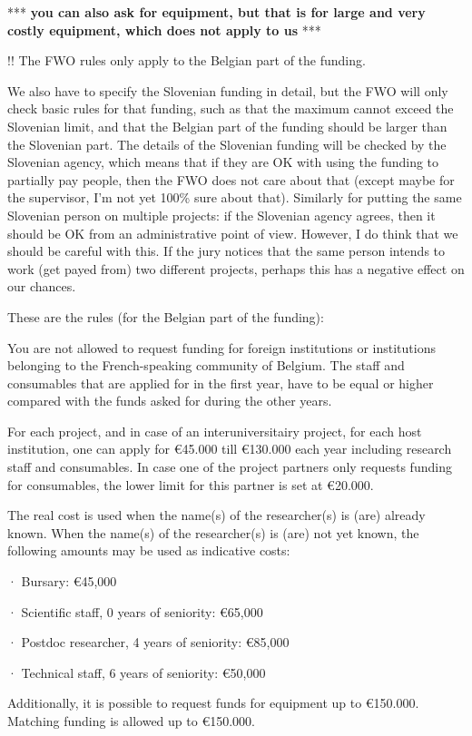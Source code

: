 \documentclass[11pt,dvipsnames,usenames,a4paper]{article}
\begin{document}
*** {\bf\color{blue} you can also ask for equipment, but that is for large and very costly equipment, which does not apply to us} ***

!! The FWO rules only apply to the Belgian part of the funding.

We also have to specify the Slovenian funding in detail, but the FWO will only check basic rules for that funding, such as that the maximum cannot exceed the Slovenian limit, and that the Belgian part of the funding should be larger than the Slovenian part. The details of the Slovenian funding will be checked by the Slovenian agency, which means that if they are OK with using the funding to partially pay people, then the FWO does not care about that (except maybe for the supervisor, I'm not yet 100\% sure about that). Similarly for putting the same Slovenian person on multiple projects: if the Slovenian agency agrees, then it should be OK from an administrative point of view. However, I do think that we should be careful with this. If the jury notices that the same person intends to work (get payed from) two different projects, perhaps this has a negative effect on our chances.

{\color{Gray}These are the rules (for the Belgian part of the funding):

You are not allowed to request funding for foreign institutions or institutions belonging to the French-speaking community of Belgium. The staff and consumables that are applied for in the first year, have to be equal or higher compared with the funds asked for during the other years. 

For each project, and in case of an interuniversitairy project, for each host institution, one can apply for €45.000 till €130.000 each year including research staff and consumables. In case one of the project partners only requests funding for consumables, the lower limit for this partner is set at €20.000. 

The real cost is used when the name(s) of the researcher(s) is (are) already known. When the name(s) of the researcher(s) is (are) not yet known, the following amounts may be used as indicative costs:

·         Bursary: €45,000

·         Scientific staff, 0 years of seniority: €65,000

·         Postdoc researcher, 4 years of seniority: €85,000

·         Technical staff, 6 years of seniority: €50,000


Additionally, it is possible to request funds for equipment up to €150.000. Matching funding is allowed up to €150.000.
}
\end{document}
